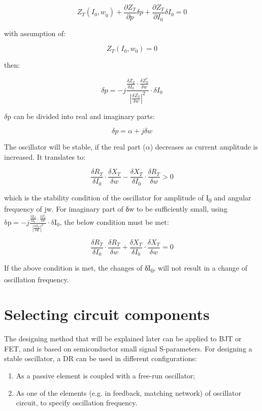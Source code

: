 \[Z_{T}\left( I_{0}{,w}_{0} \right) + \frac{{\partial Z}_{T}}{\partial p}\delta p + \frac{{\partial Z}_{T}}{\partial I_{0}}{\delta I}_{0} = 0\]

with assumption of:

\[Z_{T}\left( I_{0},w_{0} \right) = 0\]

then:

\[\delta p = - j\frac{\frac{{\delta Z}_{T}}{{\delta I}_{0}} \cdot \frac{\delta Z_{T}^{*}}{\delta w}}{\left| \frac{{\delta Z}_{T}}{\delta w} \right|^{2}} \cdot {\delta I}_{0}\]

\(\delta\)p can be divided into real and imaginary parts:

\[\delta p = \alpha + j\delta w\]

The oscillator will be stable, if the real part (\(\alpha\)) decreases
as current amplitude is increased. It translates to:

\[\frac{{\delta R}_{T}}{{\delta I}_{0}} \cdot \frac{{\delta X}_{T}}{\delta w} - \frac{{\delta X}_{T}}{{\delta I}_{0}} \cdot \frac{{\delta R}_{T}}{\delta w} > 0\]

which is the stability condition of the oscillator for amplitude of
I\textsubscript{0} and angular frequency of jw. For imaginary part of δw
to be sufficiently small, using
\(\text{δp} = - j\frac{\frac{\text{δZ}_{T}}{\text{δI}_{0}} \cdot \frac{\delta Z_{T}^{*}}{\text{δw}}}{\left| \frac{\text{δZ}_{T}}{\text{δw}} \right|^{2}} \cdot \text{δI}_{0}\),
the below condition must be met:

\[\frac{{\delta R}_{T}}{{\delta I}_{0}} \cdot \frac{{\delta R}_{T}}{\delta w} + \frac{{\delta X}_{T}}{{\delta I}_{0}} \cdot \frac{{\delta X}_{T}}{\delta w} = 0\]

If the above condition is met, the changes of δI\textsubscript{0}, will
not result in a change of oscillation frequency.

\hypertarget{selecting-circuit-components}{%
\section{Selecting circuit
components}\label{selecting-circuit-components}}

The designing method that will be explained later can be applied to BJT
or FET, and is based on semiconductor small signal S-parameters. For
designing a stable oscillator, a DR can be used in different
configurations:

\begin{enumerate}
\def\labelenumi{\arabic{enumi}.}
\item
  As a passive element is coupled with a free-run oscillator;
\item
  As one of the elements (e.g. in feedback, matching network) of
  oscillator circuit, to specify oscillation frequency.
\end{enumerate}

